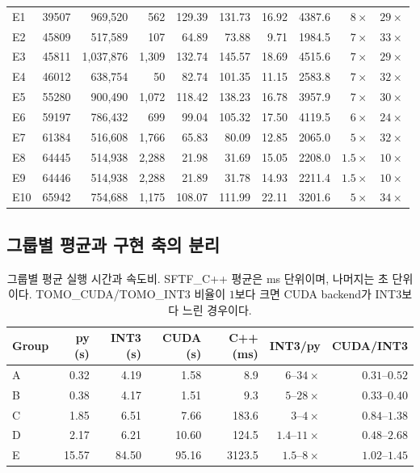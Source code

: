 \documentclass[11pt,a4paper]{article}
\begin{document}
\begin{table}[H]
{\begin{tabular}{llrrrrrrrr}
E1  & 39507 & 969{,}520   & 562   & 129.39 & 131.73 & 16.92 & 4387.6 & $8\times$   & $29\times$\\
E2  & 45809 & 517{,}589   & 107   & 64.89  & 73.88  & 9.71  & 1984.5 & $7\times$   & $33\times$\\
E3  & 45811 & 1{,}037{,}876 & 1{,}309 & 132.74 & 145.57 & 18.69 & 4515.6 & $7\times$   & $29\times$\\
E4  & 46012 & 638{,}754   & 50    & 82.74  & 101.35 & 11.15 & 2583.8 & $7\times$   & $32\times$\\
E5  & 55280 & 900{,}490   & 1{,}072 & 118.42 & 138.23 & 16.78 & 3957.9 & $7\times$   & $30\times$\\
E6  & 59197 & 786{,}432   & 699   & 99.04  & 105.32 & 17.50 & 4119.5 & $6\times$   & $24\times$\\
E7  & 61384 & 516{,}608   & 1{,}766 & 65.83  & 80.09  & 12.85 & 2065.0 & $5\times$   & $32\times$\\
E8  & 64445 & 514{,}938   & 2{,}288 & 21.98  & 31.69  & 15.05 & 2208.0 & $1.5\times$ & $10\times$\\
E9  & 64446 & 514{,}938   & 2{,}288 & 21.89  & 31.78  & 14.93 & 2211.4 & $1.5\times$ & $10\times$\\
E10 & 65942 & 754{,}688   & 1{,}175 & 108.07 & 111.99 & 22.11 & 3201.6 & $5\times$   & $34\times$\\
\bottomrule
\end{tabular}
}
\end{table}

\subsection{그룹별 평균과 구현 축의 분리}
\label{sec:impl-compare}

\begin{table}[H]
\footnotesize
\centering
\caption{그룹별 평균 실행 시간과 속도비.
SFTF\_C++ 평균은 ms 단위이며, 나머지는 초 단위이다.
TOMO\_CUDA/TOMO\_INT3 비율이 $1$보다 크면 CUDA backend가 INT3보다 느린 경우이다.}
\label{tab:fivegroup-impl}
\begin{tabular}{lrrrrrr}
\toprule
Group & py (s) & INT3 (s) & CUDA (s) & C++ (ms) & INT3/py & CUDA/INT3\\
\midrule
A & 0.32 & 4.19  & 1.58  & 8.9    & $6$--$34\times$   & $0.31$--$0.52$\\
B & 0.38 & 4.17  & 1.51  & 9.3    & $5$--$28\times$   & $0.33$--$0.40$\\
C & 1.85 & 6.51  & 7.66  & 183.6  & $3$--$4\times$    & $0.84$--$1.38$\\
D & 2.17 & 6.21  & 10.60 & 124.5  & $1.4$--$11\times$ & $0.48$--$2.68$\\
E & 15.57 & 84.50 & 95.16 & 3123.5 & $1.5$--$8\times$  & $1.02$--$1.45$\\
\bottomrule
\end{tabular}
\end{table}
\end{document}
